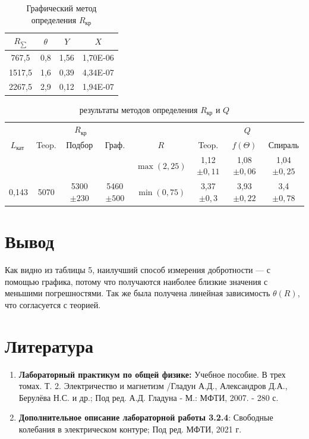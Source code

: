 \documentclass[a4paper, 12pt]{article}%
\begin{document}
\begin{table}[h!]
\begin{center}
\begin{tabular}{|c|c|c|c|}
\hline
\textbf{$R_{\sum}$} & \textbf{$\theta$} & \textbf{$Y$} & \textbf{$X$} \\ \hline
767,5                 & 0,8      & 1,56     & 1,70E-06 \\ \hline
1517,5                & 1,6      & 0,39     & 4,34E-07 \\ \hline
2267,5                & 2,9      & 0,12     & 1,94E-07 \\ \hline
\end{tabular}
\caption{Графический метод определения $R_{\text{кр}}$}
\end{center}
\end{table}

\newpage 

\begin{table}[h!]
\begin{tabular}{|c||c|c|c||c|c|c|c|}
\hline \multicolumn{1}{|l||}{} & \multicolumn{3}{c||}{$R_{\text {кр }}$}  &  & \multicolumn{3}{|c|}{$Q$} \\
\cline { 2 - 4 } \cline { 6 - 8 }$L_{\text {кат }}$ & Teop. & Подбор & Граф. & $R$ & Teop. & $f(\Theta)$ & Спираль \\
\hline \hline & & & & $\max(2,25)$  & 1,12 $\pm 0,11$ & 1,08 $\pm 0,06$ & 1,04 $\pm 0,25$\\
0,143 & 5070 & 5300 $\pm 230$ & 5460 $\pm 500$ & $\min(0,75)$ & 3,37 $\pm 0,3$ & 3,93 $\pm 0,22$ & 3,4 $\pm 0,78$\\
\hline
\end{tabular}
\caption{результаты методов определения $R_{\text{кр}}$ и $Q$}
\end{table}

\newpage

\section{Вывод}

Как видно из таблицы 5, наилучший способ измерения добротности --- с помощью графика, потому что получаются наиболее близкие значения с меньшими погрешностями. Так же была получена линейная зависимость $\theta(R)$, что согласуется с теорией.

\section{Литература}

\begin{enumerate}
\item \textbf{Лабораторный практикум по общей физике:} Учебное пособие. В трех томах. Т. 2. Электричество и магнетизм /Гладун А.Д., Александров Д.А., Берулёва Н.С. и др.; Под ред. А.Д. Гладуна - М.: МФТИ, 2007. - 280 с.
\item \textbf{Дополнительное описание лабораторной работы 3.2.4}: Свободные колебания в электрическом контуре; Под ред. МФТИ, 2021 г.
\end{enumerate}

					
\end{document}
